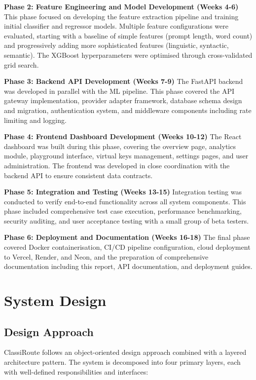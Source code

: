 \documentclass[oneside,12pt,a4paper]{report}
\begin{document}
\textbf{Phase 2: Feature Engineering and Model Development (Weeks 4-6)}
This phase focused on developing the feature extraction pipeline and training initial classifier and regressor models. Multiple feature configurations were evaluated, starting with a baseline of simple features (prompt length, word count) and progressively adding more sophisticated features (linguistic, syntactic, semantic). The XGBoost hyperparameters were optimised through cross-validated grid search.

\textbf{Phase 3: Backend API Development (Weeks 7-9)}
The FastAPI backend was developed in parallel with the ML pipeline. This phase covered the API gateway implementation, provider adapter framework, database schema design and migration, authentication system, and middleware components including rate limiting and logging.

\textbf{Phase 4: Frontend Dashboard Development (Weeks 10-12)}
The React dashboard was built during this phase, covering the overview page, analytics module, playground interface, virtual keys management, settings pages, and user administration. The frontend was developed in close coordination with the backend API to ensure consistent data contracts.

\textbf{Phase 5: Integration and Testing (Weeks 13-15)}
Integration testing was conducted to verify end-to-end functionality across all system components. This phase included comprehensive test case execution, performance benchmarking, security auditing, and user acceptance testing with a small group of beta testers.

\textbf{Phase 6: Deployment and Documentation (Weeks 16-18)}
The final phase covered Docker containerisation, CI/CD pipeline configuration, cloud deployment to Vercel, Render, and Neon, and the preparation of comprehensive documentation including this report, API documentation, and deployment guides.

\chapter{System Design}

\section{Design Approach}

ClassiRoute follows an object-oriented design approach combined with a layered architecture pattern. The system is decomposed into four primary layers, each with well-defined responsibilities and interfaces:
\end{document}
